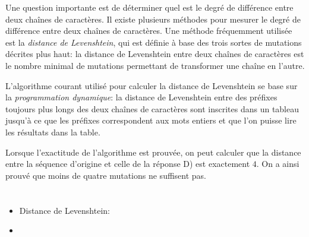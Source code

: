 {{Une question importante est de déterminer quel est le degré de différence entre deux chaînes de caractères. Il existe plusieurs méthodes pour mesurer le degré de différence entre deux chaînes de caractères. Une méthode fréquemment utilisée est la \emph{distance de Levenshtein}, qui est définie à base des trois sortes de mutations décrites plus haut: la distance de Levenshtein entre deux chaînes de caractères est le nombre minimal de mutations permettant de transformer une chaîne en l’autre.

L’algorithme courant utilisé pour calculer la distance de Levenshtein se base sur la \emph{programmation dynamique}: la distance de Levenshtein entre des préfixes toujours plus longs des deux chaînes de caractères sont inscrites dans un tableau jusqu’à ce que les préfixes correspondent aux mots entiers et que l’on puisse lire les résultats dans la table.

Lorsque l’exactitude de l’algorithme est prouvée, on peut calculer que la distance entre la séquence d’origine et celle de la réponse D) est exactement $4$. On a ainsi prouvé que moins de quatre mutations ne suffisent pas.



\section*{\BrochureWebsitesAndKeywords}
{\raggedright
\begin{itemize}
  \item Distance de Levenshtein: \href{https://fr.wikipedia.org/wiki/Distance_de_Levenshtein}{}
  \item \href{https://fr.wikipedia.org/wiki/Cha\%C3\%AEne_de_caract\%C3\%A8res}{}
\end{itemize}


}

}{}

\def\AuthorNataliV{} %
\def\AuthorPutraR{} %
\def\AuthorNatawigenaR{} %
\def\AuthorFreiF{} %
\def\AuthorDatzkoS{} %
\def\AuthorVasigaT{} %
\def\AuthorPelletE{} %

\newpage}{}
